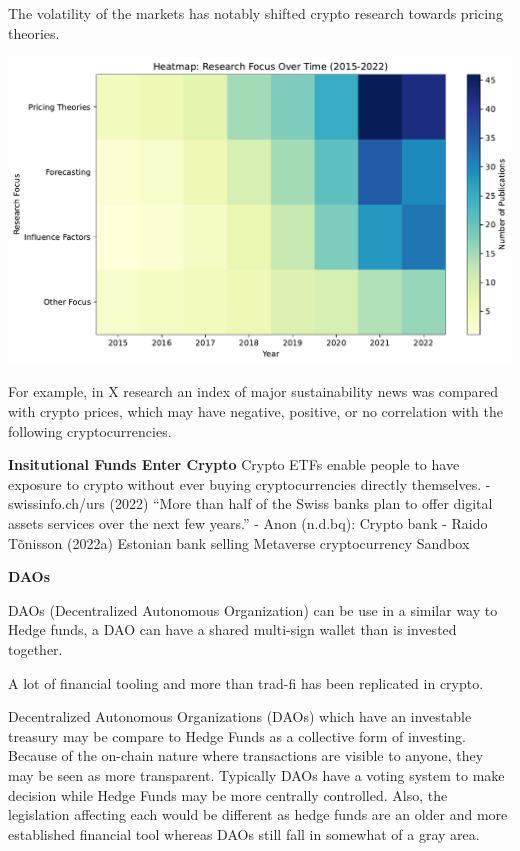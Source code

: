 \documentclass[
  letterpaper,
  DIV=11,
  numbers=noendperiod]{scrartcl}
\begin{document}
The volatility of the markets has notably shifted crypto research
towards pricing theories.

\includegraphics{_thesis_files/figure-pdf/cell-45-output-1.pdf}

For example, in X research an index of major sustainability news was
compared with crypto prices, which may have negative, positive, or no
correlation with the following cryptocurrencies.

\textbf{Insitutional Funds Enter Crypto} Crypto ETFs enable people to
have exposure to crypto without ever buying cryptocurrencies directly
themselves. - swissinfo.ch/urs (2022) ``More than half of the Swiss
banks plan to offer digital assets services over the next few years.'' -
Anon (n.d.bq): Crypto bank - Raido Tõnisson (2022a) Estonian bank
selling Metaverse cryptocurrency Sandbox

\textbf{DAOs}

DAOs (Decentralized Autonomous Organization) can be use in a similar way
to Hedge funds, a DAO can have a shared multi-sign wallet than is
invested together.

A lot of financial tooling and more than trad-fi has been replicated in
crypto.

Decentralized Autonomous Organizations (DAOs) which have an investable
treasury may be compare to Hedge Funds as a collective form of
investing. Because of the on-chain nature where transactions are visible
to anyone, they may be seen as more transparent. Typically DAOs have a
voting system to make decision while Hedge Funds may be more centrally
controlled. Also, the legislation affecting each would be different as
hedge funds are an older and more established financial tool whereas
DAOs still fall in somewhat of a gray area.
\end{document}
